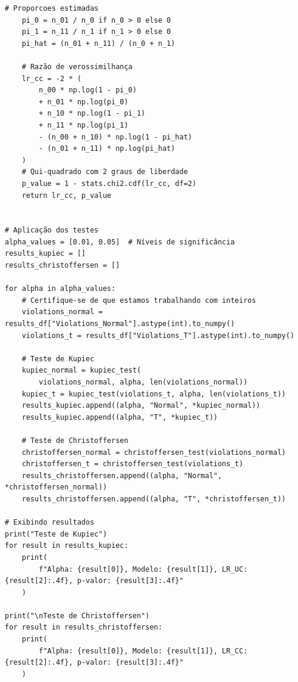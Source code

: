 \documentclass[a4paper, 12pt]{article}
\begin{document}
\begin{lstlisting}[style=python]
    # Proporcoes estimadas
    pi_0 = n_01 / n_0 if n_0 > 0 else 0
    pi_1 = n_11 / n_1 if n_1 > 0 else 0
    pi_hat = (n_01 + n_11) / (n_0 + n_1)

    # Razão de verossimilhança
    lr_cc = -2 * (
        n_00 * np.log(1 - pi_0)
        + n_01 * np.log(pi_0)
        + n_10 * np.log(1 - pi_1)
        + n_11 * np.log(pi_1)
        - (n_00 + n_10) * np.log(1 - pi_hat)
        - (n_01 + n_11) * np.log(pi_hat)
    )
    # Qui-quadrado com 2 graus de liberdade
    p_value = 1 - stats.chi2.cdf(lr_cc, df=2)
    return lr_cc, p_value


# Aplicação dos testes
alpha_values = [0.01, 0.05]  # Níveis de significância
results_kupiec = []
results_christoffersen = []

for alpha in alpha_values:
    # Certifique-se de que estamos trabalhando com inteiros
    violations_normal = results_df["Violations_Normal"].astype(int).to_numpy()
    violations_t = results_df["Violations_T"].astype(int).to_numpy()

    # Teste de Kupiec
    kupiec_normal = kupiec_test(
        violations_normal, alpha, len(violations_normal))
    kupiec_t = kupiec_test(violations_t, alpha, len(violations_t))
    results_kupiec.append((alpha, "Normal", *kupiec_normal))
    results_kupiec.append((alpha, "T", *kupiec_t))

    # Teste de Christoffersen
    christoffersen_normal = christoffersen_test(violations_normal)
    christoffersen_t = christoffersen_test(violations_t)
    results_christoffersen.append((alpha, "Normal", *christoffersen_normal))
    results_christoffersen.append((alpha, "T", *christoffersen_t))

# Exibindo resultados
print("Teste de Kupiec")
for result in results_kupiec:
    print(
        f"Alpha: {result[0]}, Modelo: {result[1]}, LR_UC: {result[2]:.4f}, p-valor: {result[3]:.4f}"
    )

print("\nTeste de Christoffersen")
for result in results_christoffersen:
    print(
        f"Alpha: {result[0]}, Modelo: {result[1]}, LR_CC: {result[2]:.4f}, p-valor: {result[3]:.4f}"
    )

\end{lstlisting}
\end{document}
